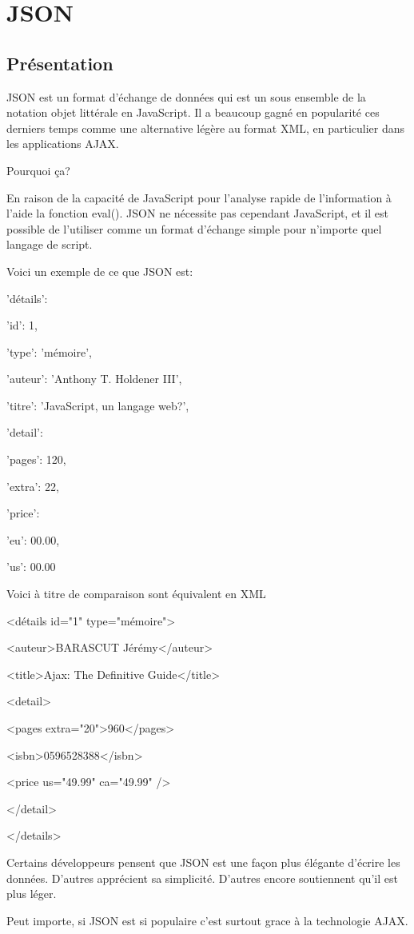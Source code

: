 \section{JSON}
\label{ch:json}

\subsection{Présentation}


JSON est un format d’échange de données qui est un sous ensemble de la notation objet littérale en JavaScript. Il a beaucoup gagné en popularité ces derniers temps comme une alternative légère au format XML, en particulier dans les applications AJAX.

Pourquoi ça?

En raison de la capacité de JavaScript pour l’analyse rapide de l’information à l’aide la fonction eval(). JSON ne nécessite pas cependant JavaScript, et il est possible de l’utiliser comme un format d’échange simple pour n’importe quel langage de script.

Voici un exemple de ce que JSON est:

{'détails': {

'id': 1,

'type': 'mémoire',

'auteur': 'Anthony T. Holdener III',

'titre': 'JavaScript, un langage web?',

'detail': {

'pages': 120,

'extra': 22,

'price': {

'eu': 00.00,

'us': 00.00

}

}

}}

Voici à titre de comparaison sont équivalent en XML

<détails id="1" type="mémoire">

<auteur>BARASCUT Jérémy</auteur>

<title>Ajax: The Definitive Guide</title>

<detail>

<pages extra="20">960</pages>

<isbn>0596528388</isbn>

<price us="49.99" ca="49.99" />

</detail>

</details>

Certains développeurs pensent que JSON est une façon plus élégante d’écrire les données. D’autres apprécient sa simplicité. D’autres encore soutiennent qu’il est plus léger.

Peut importe, si JSON est si populaire c’est surtout grace à la technologie AJAX.

